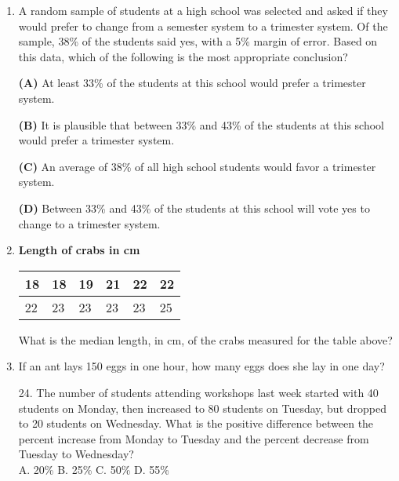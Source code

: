 \documentclass[../satmath.tex]{subfiles}
\begin{document}
\begin{enumerate}[label=\bfseries\arabic*.]
\item A random sample of students at a high school was selected and asked if they would prefer to change from a semester system to a trimester 
system. Of the sample, 38\% of the students said yes, with a 5\% margin of error. Based on this data, which of the following is the most appropriate conclusion?

\textbf{(A) } At least 33\% of the students at this school would prefer a trimester system.

\textbf{(B) } It is plausible that between 33\% and 43\% of the students at this school would prefer a trimester system.

\textbf{(C) } An average of 38\% of all high school students would favor a trimester system.

\textbf{(D) } Between 33\% and 43\% of the students at this school will vote yes to change to a trimester system.
 
\item 

\begin{center}
    \textbf{Length of crabs in cm}
\end{center}
\begin{table}[h]
    \centering
    \begin{tabular}{|l|l|l|l|l|l|}
    \hline
    18 & 18 & 19 & 21 & 22 & 22 \\ \hline
    22 & 23 & 23 & 23 & 23 & 25 \\ \hline
    \end{tabular}
\end{table}
What is the median length, in cm, of the crabs measured for the table above?
 
\item If an ant lays 150 eggs in one hour, how many eggs does she lay in one day?
 
24. The number of students attending workshops last week started with 40 students on Monday, then increased to 80 students on Tuesday, but dropped to 
20 students on Wednesday. What is the positive difference between the percent increase from Monday to Tuesday and the percent decrease from Tuesday to Wednesday?\\
A. 20\% \quad B. 25\% \quad C. 50\% \quad D. 55\%


\end{enumerate}
\end{document}
